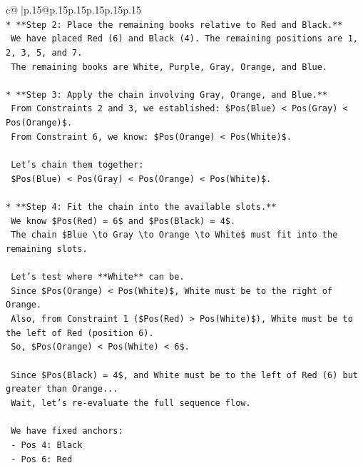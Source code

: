 \documentclass{article}
\begin{document}
{\begin{supertabular}{c@{$\;$}|p{.15\linewidth}@{}p{.15\linewidth}p{.15\linewidth}p{.15\linewidth}p{.15\linewidth}p{.15\linewidth}}
{{{\\ 
\texttt{*   **Step 2: Place the remaining books relative to Red and Black.**} \\
\texttt{    We have placed Red (6) and Black (4). The remaining positions are 1, 2, 3, 5, and 7.} \\
\texttt{    The remaining books are White, Purple, Gray, Orange, and Blue.} \\
\\ 
\texttt{*   **Step 3: Apply the chain involving Gray, Orange, and Blue.**} \\
\texttt{    From Constraints 2 and 3, we established: \$Pos(Blue) < Pos(Gray) < Pos(Orange)\$.} \\
\texttt{    From Constraint 6, we know: \$Pos(Orange) < Pos(White)\$.} \\
\\ 
\texttt{    Let's chain them together:} \\
\texttt{    \$Pos(Blue) < Pos(Gray) < Pos(Orange) < Pos(White)\$.} \\
\\ 
\texttt{*   **Step 4: Fit the chain into the available slots.**} \\
\texttt{    We know \$Pos(Red) = 6\$ and \$Pos(Black) = 4\$.} \\
\texttt{    The chain \$Blue \textbackslash{}to Gray \textbackslash{}to Orange \textbackslash{}to White\$ must fit into the remaining slots.} \\
\\ 
\texttt{    Let's test where **White** can be.} \\
\texttt{    Since \$Pos(Orange) < Pos(White)\$, White must be to the right of Orange.} \\
\texttt{    Also, from Constraint 1 (\$Pos(Red) > Pos(White)\$), White must be to the left of Red (position 6).} \\
\texttt{    So, \$Pos(Orange) < Pos(White) < 6\$.} \\
\\ 
\texttt{    Since \$Pos(Black) = 4\$, and White must be to the left of Red (6) but greater than Orange...} \\
\texttt{    Wait, let's re{-}evaluate the full sequence flow.} \\
\\ 
\texttt{    We have fixed anchors:} \\
\texttt{    {-} Pos 4: Black} \\
\texttt{    {-} Pos 6: Red} \\
}}}
\end{supertabular}}
\end{document}
